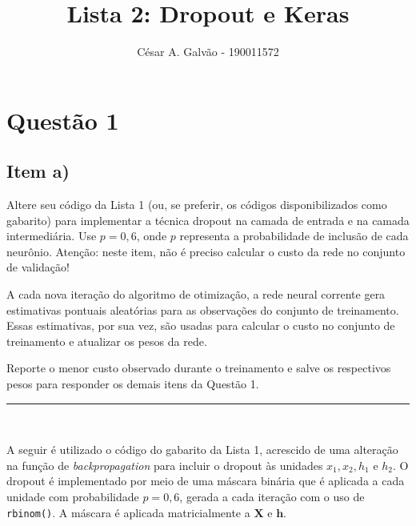 \documentclass[
  a4paperpaper,
]{article}
\title{Lista 2: Dropout e Keras}
\author{César A. Galvão - 190011572}
\date{}
\begin{document}
\maketitle

\section{Questão 1}\label{questuxe3o-1}

\subsection{Item a)}\label{item-a}

Altere seu código da Lista 1 (ou, se preferir, os códigos
disponibilizados como gabarito) para implementar a técnica dropout na
camada de entrada e na camada intermediária. Use \(p = 0,6\), onde \(p\)
representa a probabilidade de inclusão de cada neurônio. Atenção: neste
item, não é preciso calcular o custo da rede no conjunto de validação!

A cada nova iteração do algoritmo de otimização, a rede neural corrente
gera estimativas pontuais aleatórias para as observações do conjunto de
treinamento. Essas estimativas, por sua vez, são usadas para calcular o
custo no conjunto de treinamento e atualizar os pesos da rede.

Reporte o menor custo observado durante o treinamento e salve os
respectivos pesos para responder os demais itens da Questão 1.

\begin{center}\rule{0.5\linewidth}{0.5pt}\end{center}

~

A seguir é utilizado o código do gabarito da Lista 1, acrescido de uma
alteração na função de \emph{backpropagation} para incluir o dropout às
unidades \(x_1, x_2, h_1\) e \(h_2\). O dropout é implementado por meio
de uma máscara binária que é aplicada a cada unidade com probabilidade
\(p = 0,6\), gerada a cada iteração com o uso de \texttt{rbinom()}. A
máscara é aplicada matricialmente a \(\mathbf{X}\) e \(\mathbf{h}\).

~
\end{document}
